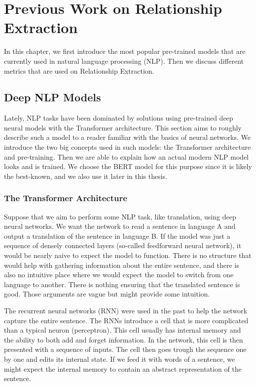 \chapter{Previous Work on Relationship Extraction}
In this chapter, we first introduce the most popular pre-trained models that are currently used in natural language processing (NLP). Then we discuss different metrics that are used on Relationship Extraction.

\section{Deep NLP Models}
Lately, NLP tasks have been dominated by solutions using pre-trained deep neural models with the Transformer architecture. This section aims to roughly describe such a model to a reader familiar with the basics of neural networks. We introduce the two big concepts used in such models: the Transformer architecture and pre-training. Then we are able to explain how an actual modern NLP model looks and is trained. We choose the BERT model for this purpose since it is likely the best-known, and we also use it later in this thesis. 



\subsection{The Transformer Architecture}
Suppose that we aim to perform some NLP task, like translation, using deep neural networks. We want the network to read a sentence in language A and output a translation of the sentence in language B. If the model was just a sequence of densely connected layers (so-called feedforward neural network), it would be nearly naive to expect the model to function. There is no structure that would help with gathering information about the entire sentence, and there is also no intuitive place where we would expect the model to switch from one language to another. There is nothing ensuring that the translated sentence is good. Those arguments are vague but might provide some intuition.

The recurrent neural networks (RNN) were used in the past to help the network capture the entire sentence. The RNNs introduce a cell that is more complicated than a typical neuron (perceptron). This cell usually has internal memory and the ability to both add and forget information. In the network, this cell is then presented with a sequence of inputs. The cell then goes trough the sequence one by one and edits its internal state. If we feed it with words of a sentence, we might expect the internal memory to contain an abstract representation of the sentence. 

